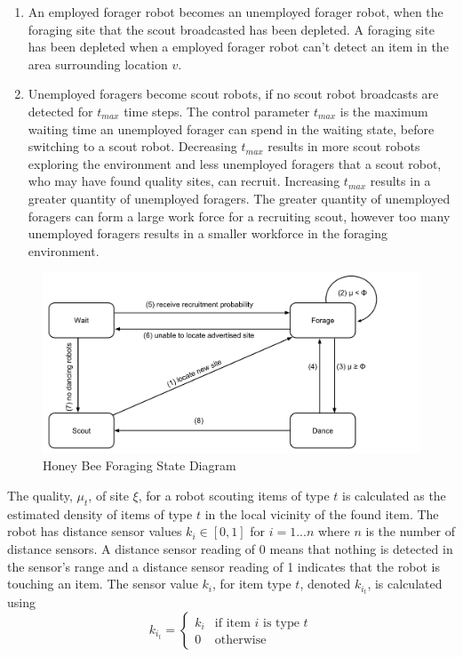 \begin{enumerate}
\item An employed forager robot becomes an unemployed forager robot, when the foraging site that the scout broadcasted has been depleted. A foraging site has been depleted when a employed forager robot can't detect an item in the area surrounding location $v$.

\item Unemployed foragers become scout robots, if no scout robot broadcasts are detected for $t_{max}$ time steps. The control parameter $t_{max}$ 
is the maximum waiting time an unemployed forager can spend in the waiting state, before switching to a scout robot. Decreasing $t_{max}$ results in more scout robots exploring the environment and less unemployed foragers that a scout robot, who may have found quality sites, can recruit. Increasing $t_{max}$ results in a greater quantity of unemployed foragers. The greater quantity of unemployed foragers can form a large work force for a recruiting scout, however too many unemployed foragers results in a smaller workforce in the foraging environment.
\end{enumerate}

\begin{figure}[h]
	\centering
	\includegraphics[width=\textwidth]{chapters/chapter3/figures/HoneyBee.pdf}
	\caption{Honey Bee Foraging State Diagram }
	\label{honeybeestate}
\end{figure}

The quality, $\mu_t$, of site $\xi$, for a robot scouting items of type $t$ is calculated as the estimated density of items of type $t$ in the local vicinity of the found item. The robot has distance sensor values $k_i\in[0,1]$ for $ i = 1...n$ where $n$ is the number of distance sensors. A distance sensor reading of 0 means that nothing is detected in the sensor's range and a distance sensor reading of 1 indicates that the robot is touching an item. The sensor value $k_i$, for item type $t$, denoted $k_{i_t}$, is calculated using 
\begin{equation}
\label{densitytype}
k_{i_t}=
    \begin{cases}
      k_i & \text{if item $i$ is type $t$} \\
      0 & \text{otherwise}
    \end{cases}
\end{equation}

